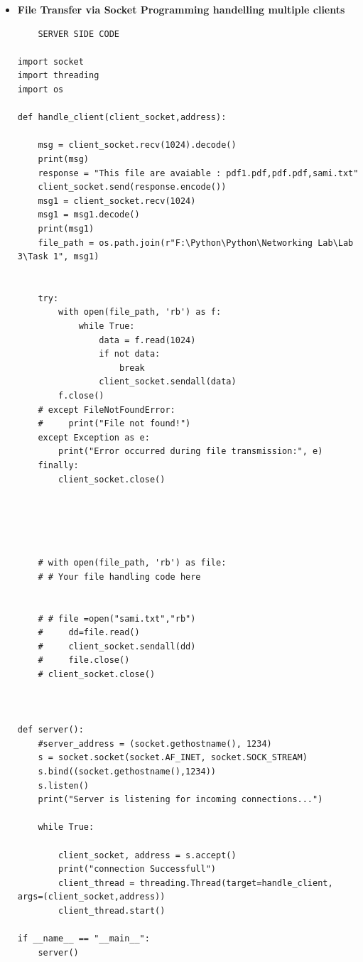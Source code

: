 \documentclass[11pt]{article}
\begin{document}
\begin{itemize}
    \item \textbf{File Transfer via Socket Programming handelling multiple clients}
    
    
    \begin{verbatim}
    SERVER SIDE CODE
   
import socket
import threading
import os

def handle_client(client_socket,address):
    
    msg = client_socket.recv(1024).decode()
    print(msg)
    response = "This file are avaiable : pdf1.pdf,pdf.pdf,sami.txt"
    client_socket.send(response.encode())
    msg1 = client_socket.recv(1024)
    msg1 = msg1.decode()
    print(msg1)
    file_path = os.path.join(r"F:\Python\Python\Networking Lab\Lab 3\Task 1", msg1)
  

    try:
        with open(file_path, 'rb') as f:
            while True:
                data = f.read(1024)
                if not data:
                    break
                client_socket.sendall(data)
        f.close()
    # except FileNotFoundError:
    #     print("File not found!")
    except Exception as e:
        print("Error occurred during file transmission:", e)
    finally:
        client_socket.close()

  

    

    # with open(file_path, 'rb') as file:
    # # Your file handling code here


    # # file =open("sami.txt","rb")
    #     dd=file.read()
    #     client_socket.sendall(dd)
    #     file.close()
    # client_socket.close()



def server():
    #server_address = (socket.gethostname(), 1234)
    s = socket.socket(socket.AF_INET, socket.SOCK_STREAM)
    s.bind((socket.gethostname(),1234))
    s.listen()
    print("Server is listening for incoming connections...")

    while True:
        
        client_socket, address = s.accept()
        print("connection Successfull")
        client_thread = threading.Thread(target=handle_client, args=(client_socket,address))
        client_thread.start()

if __name__ == "__main__":
    server()

\end{verbatim}



\end{itemize}
\end{document}
